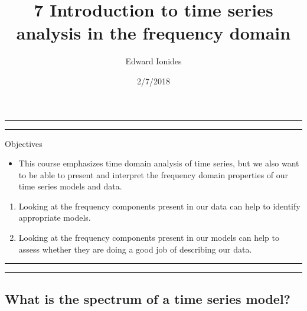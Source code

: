 \documentclass[]{article}
\title{7 Introduction to time series analysis in the frequency domain}
\author{Edward Ionides}
\date{2/7/2018}
\providecommand{\tightlist}{%
  \setlength{\itemsep}{0pt}\setlength{\parskip}{0pt}}
\begin{document}
\maketitle

{
\setcounter{tocdepth}{2}
\tableofcontents
}
\newcommand\prob{\mathbb{P}}
\newcommand\E{\mathbb{E}}
\newcommand\var{\mathrm{Var}}
\newcommand\cov{\mathrm{Cov}}
\newcommand\loglik{\ell}
\newcommand\R{\mathbb{R}}
\newcommand\data[1]{#1^*}
\newcommand\params{\, ; \,}
\newcommand\eqspace{\quad\quad\quad}
\newcommand\lik{\mathscr{L}}
\newcommand\profileloglik[1]{\ell^\mathrm{profile}_#1}
\newcommand\ar{\phi}
\newcommand\ma{\psi}
\newcommand\AR{\Phi}
\newcommand\MA{\Psi}
\newcommand\ev{u}





\begin{center}\rule{0.5\linewidth}{\linethickness}\end{center}

\begin{center}\rule{0.5\linewidth}{\linethickness}\end{center}

Objectives

\begin{itemize}
\tightlist
\item
  This course emphasizes time domain analysis of time series, but we
  also want to be able to present and interpret the frequency domain
  properties of our time series models and data.
\end{itemize}

\begin{enumerate}
\def\labelenumi{\arabic{enumi}.}
\item
  Looking at the frequency components present in our data can help to
  identify appropriate models.
\item
  Looking at the frequency components present in our models can help to
  assess whether they are doing a good job of describing our data.
\end{enumerate}

\begin{center}\rule{0.5\linewidth}{\linethickness}\end{center}

\begin{center}\rule{0.5\linewidth}{\linethickness}\end{center}

\subsection{What is the spectrum of a time series
model?}\label{what-is-the-spectrum-of-a-time-series-model}
\end{document}
